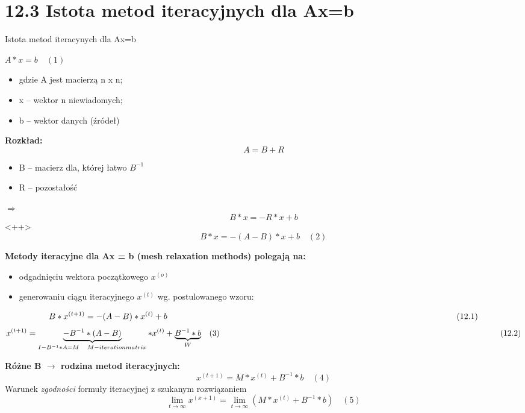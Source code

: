 \section{12.3 Istota metod iteracyjnych dla Ax=b}

\begin{frame}{Istota metod iteracynych dla Ax=b}
    \begin{center}
      $A*x=b\quad(1)$
    \end{center}
    \begin{itemize}
      \item gdzie A jest macierzą n x n;
      \item x -- wektor n niewiadomych;
      \item b -- wektor danych (źródeł)
    \end{itemize}
\end{frame}

\begin{frame}
  \begin{block}{\textbf{Rozkład:}}
      $$A=B+R$$
    \begin{itemize}
      \item B -- macierz dla, której łatwo $B^{-1}$
      \item R -- pozostałość
    \end{itemize}
    $\Rightarrow$
    $$B*x=-R*x+b$$<++>
  $$\boxed{B*x=-(A-B)*x+b}\quad(2)$$
  \end{block}
\end{frame}

\begin{frame}{}
    \textbf{Metody iteracyjne dla Ax = b (mesh relaxation methods) polegają na:}
    \begin{itemize}
      \item odgadnięciu wektora początkowego $x^{(o)}$
      \item generowaniu ciągu iteracyjnego $x^{(t)}$ wg. postulowanego wzoru:
    \end{itemize}
    $$B*x^{(t+1)}=-(A-B)*x^{(t)}+b \hskip \textwidth minus \textwidth (12.1)$$
    $$x^{(t+1)}=\underbrace{-B^{-1}*(A-B)}_{I-B^{-1}*A=M \quad M - iteration matrix} *x^{(t)}+\underbrace{B^{-1}*b}_{W}\quad(3) \hskip \textwidth minus \textwidth (12.2)$$
\end{frame}

\begin{frame}{}
    \textbf{Różne B $\rightarrow$ rodzina metod iteracyjnych:}
    $$\boxed{x^{(t+1)}=M*x^{(t)}+B^{-1}*b}\quad(4)$$
    Warunek \emph{zgodności} formuły iteracyjnej z szukanym rozwiązaniem
    $$\lim_{t\to\infty} x^{(x+1)}= \lim_{t\to\infty}  (M*x^{(t)}+B^{-1}*b) \quad (5)$$
\end{frame}

